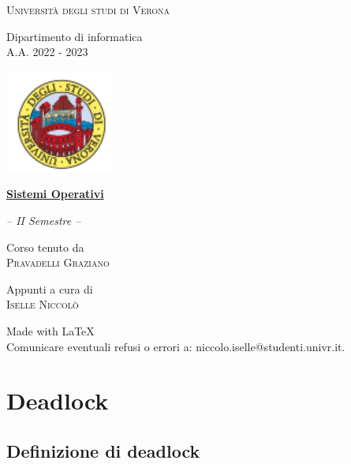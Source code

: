 \documentclass[a4paper,12pt, twoside]{report}
\makeatletter
\newcommand{\email}{niccolo.iselle@studenti.univr.it}
\makeatother
\begin{document}
\begin{titlepage}
\centering
\textsc{Universit\`a degli studi di Verona}
\par\vspace{0.5cm}
\rmfamily
Dipartimento di informatica \\
A.A. 2022 - 2023
\par\vspace{1cm}
\includegraphics[scale=0.5]{univr}
\par\vspace{2cm}

\textbf{\Huge{\underline{Sistemi Operativi}}}
\par\vspace{0.5cm}
\textit{\large{-- II Semestre --}}

\par\vspace{1cm}
\footnotesize
Corso tenuto da \\
\normalsize
\textsc{Pravadelli Graziano}
\par\vspace{1cm}
\footnotesize
Appunti a cura di \\
\normalsize
\textsc{Iselle Niccol\`o}
\par\vspace{1cm}

\vfill
\footnotesize
Made with \LaTeX \\
\small
Comunicare eventuali refusi o errori a: \email.
\end{titlepage}
\afterpage{\blankpage}
\tableofcontents

\chapter{Deadlock}

\section{Definizione di deadlock}
\end{document}

